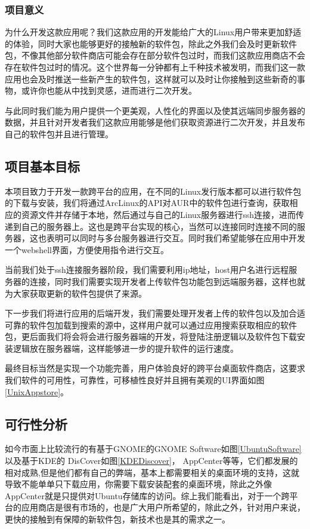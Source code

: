 \documentclass[lang=cn,a4paper]{elegantpaper}
\begin{document}
\subsubsection{项目意义}

为什么开发这款应用呢？我们这款应用的开发能给广大的Linux用户带来更加舒适的体验，同时大家也能够更好的接触新的软件包，除此之外我们会及时更新软件包，不像其他部分软件商店可能会存在部分软件包过时，而我们这款应用商店不会存在软件包过时的情况。这个世界每一分钟都有上千种技术被发明，而我们这一款应用也会及时推送一些新产生的软件包，这样就可以及时让你接触到这些新奇的事物，或许你也能从中找到灵感，进而进行二次开发。

与此同时我们能为用户提供一个更美观，人性化的界面以及使其远端同步服务器的数据，并且针对开发者我们这款应用能够是他们获取资源进行二次开发，并且发布自己的软件包并且进行管理。

\subsection{项目基本目标}
本项目致力于开发一款跨平台的应用，在不同的Linux发行版本都可以进行软件包的下载与安装，我们将通过ArcLinux的API对AUR中的软件包进行查询，获取相应的资源文件并存储于本地，然后通过与自己的Linux服务器进行ssh连接，进而传递到自己的服务器上。这也是跨平台实现的核心，当然可以连接同时连接不同的服务器，这也表明可以同时与多台服务器进行交互。同时我们希望能够在应用中开发一个webshell界面，方便使用指令进行交互。

当前我们处于ssh连接服务器阶段，我们需要利用ip地址，host用户名进行远程服务器的连接，同时我们需要实现开发者上传软件包功能包到远端服务器，这样也就为大家获取更新的软件包提供了来源。

下一步我们将进行应用的后端开发，我们需要处理开发者上传的软件包以及加合适可靠的软件包加载到搜索的源中，这样用户就可以通过应用搜索获取相应的软件包，更后面我们将会将会进行服务器端的开发，将登陆注册逻辑以及软件包下载安装逻辑放在服务器端，这样能够进一步的提升软件的运行速度。

最终目标当然是实现一个功能完善，用户体验良好的跨平台桌面软件商店，这要求我们软件的可用性，可靠性，可移植性良好并且拥有美观的UI界面如图\ref{UnixAppstore}。


\subsection{可行性分析}

如今市面上比较流行的有基于GNOME的GNOME Software如图\ref{UbuntuSoftware} 以及基于KDE的 DisCover如图\ref{KDEDiscover}， AppCenter等等，它们都发展的相对成熟,但是他们都有自己的弊端，基本上都需要相关的桌面环境的支持，这就导致不能单单只下载应用，你需要下载安装配套的桌面环境，除此之外像AppCenter就是只提供对Ubuntu存储库的访问。综上我们能看出，对于一个跨平台的应用商店是很有市场的，也是广大用户所希望的，除此之外，针对用户来说，更快的接触到有保障的新软件包，新技术也是其的需求之一。
\end{document}
